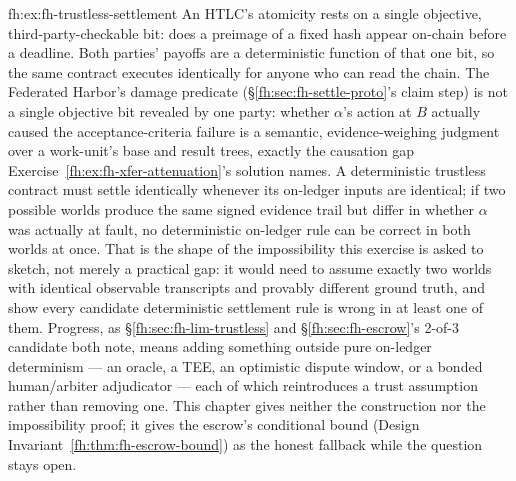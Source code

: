 \begin{pdSolution}{fh:ex:fh-trustless-settlement}
An HTLC's atomicity rests on a single objective, third-party-checkable bit: does a preimage of a fixed hash appear on-chain before a deadline. Both parties' payoffs are a deterministic function of that one bit, so the same contract executes identically for anyone who can read the chain. The Federated Harbor's damage predicate (\S\ref{fh:sec:fh-settle-proto}'s claim step) is not a single objective bit revealed by one party: whether $\alpha$'s action at $B$ actually caused the acceptance-criteria failure is a semantic, evidence-weighing judgment over a work-unit's base and result trees, exactly the causation gap Exercise~\ref{fh:ex:fh-xfer-attenuation}'s solution names. A deterministic trustless contract must settle identically whenever its on-ledger inputs are identical; if two possible worlds produce the same signed evidence trail but differ in whether $\alpha$ was actually at fault, no deterministic on-ledger rule can be correct in both worlds at once. That is the shape of the impossibility this exercise is asked to sketch, not merely a practical gap: it would need to assume exactly two worlds with identical observable transcripts and provably different ground truth, and show every candidate deterministic settlement rule is wrong in at least one of them. Progress, as \S\ref{fh:sec:fh-lim-trustless} and \S\ref{fh:sec:fh-escrow}'s 2-of-3 candidate both note, means adding something outside pure on-ledger determinism --- an oracle, a TEE, an optimistic dispute window, or a bonded human/arbiter adjudicator --- each of which reintroduces a trust assumption rather than removing one. This chapter gives neither the construction nor the impossibility proof; it gives the escrow's conditional bound (Design Invariant~\ref{fh:thm:fh-escrow-bound}) as the honest fallback while the question stays open.
\end{pdSolution}
